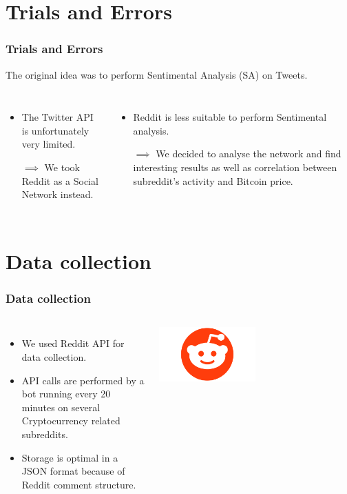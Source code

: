 \documentclass[aspectratio=169]{beamer}
\begin{document}
\section{Trials and Errors}
\begin{frame}[t]
    \frametitle{Trials and Errors}
            The original idea was to perform Sentimental Analysis (SA) on Tweets.
                \vspace{2.0cm}
    \begin{columns}
        \begin{itemize}
            \item The Twitter API is unfortunately very limited.
            \item[$\implies$] We took Reddit as a Social Network instead.
        \end{itemize}
        \begin{itemize}
            \item Reddit is less suitable to perform Sentimental analysis.
            \item[$\implies$] We decided to analyse the network and find interesting results as well as correlation between subreddit's activity and Bitcoin price.
        \end{itemize}

    \end{columns}
\end{frame}
\section{Data collection}
\begin{frame}[t]
    \frametitle{Data collection}
    \vspace{1.0cm}
    \begin{columns}
        \begin{itemize}
            \item We used Reddit API for data collection.
            \item API calls are performed by a bot running every 20 minutes on several Cryptocurrency related subreddits.
            \item Storage is optimal in a JSON format because of Reddit comment structure.
        \end{itemize}
        \hspace{1.0cm}
        \includegraphics[width=0.5\textwidth]{figures/reddit_logo.png}
    \end{columns}
\end{frame}
\end{document}
